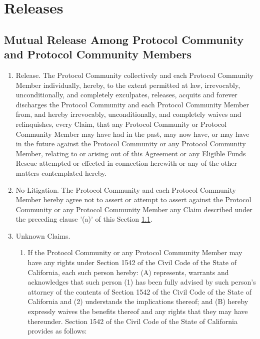 \documentclass{article}
\begin{document}
\section{Releases}\label{sec:releases}

\subsection{Mutual Release Among Protocol Community and Protocol Community Members}\label{subsec:mutual_release}

\begin{enumerate}
    \item Release. The Protocol Community collectively and each Protocol Community Member individually, hereby, to the extent permitted at law, irrevocably, unconditionally, and completely exculpates, releases, acquits and forever discharges the Protocol Community and each Protocol Community Member from, and hereby irrevocably, unconditionally, and completely waives and relinquishes, every Claim, that any Protocol Community or Protocol Community Member may have had in the past, may now have, or may have in the future against the Protocol Community or any Protocol Community Member, relating to or arising out of this Agreement or any Eligible Funds Rescue attempted or effected in connection herewith or any of the other matters contemplated hereby.

    \item No-Litigation. The Protocol Community and each Protocol Community Member hereby agree not to assert or attempt to assert against the Protocol Community or any Protocol Community Member any Claim described under the preceding clause '(a)' of this Section \ref{subsec:mutual_release}.

    \item Unknown Claims.

          \begin{enumerate}
              \item If the Protocol Community or any Protocol Community Member may have any rights under Section 1542 of the Civil Code of the State of California, each such person hereby: (A) represents, warrants and acknowledges that such person (1) has been fully advised by such person's attorney of the contents of Section 1542 of the Civil Code of the State of California and (2) understands the implications thereof; and (B) hereby expressly waives the benefits thereof and any rights that they may have thereunder. Section 1542 of the Civil Code of the State of California provides as follows:


\end{enumerate}
\end{enumerate}
\end{document}
